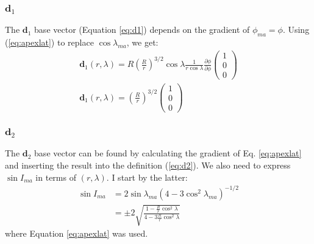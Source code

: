 \documentclass[11pt]{article}
\begin{document}
\subsubsection{$\mathbf{d}_1$}
The $\mathbf{d}_1$ base vector (Equation \ref{eq:d1}) depends on the gradient of $\phi_{ma} = \phi$. Using (\ref{eq:apexlat}) to replace $\cos\lambda_{ma}$, we get:
\begin{eqnarray}
\mathbf{d}_1(r, \lambda) = R\left(\frac{R}{r}\right)^{3/2}\cos\lambda \frac{1}{r\cos\lambda}\frac{\partial \phi}{\partial \phi} \begin{pmatrix} 1\\ 0\\ 0 \end{pmatrix} \\
\boxed{\mathbf{d}_1(r, \lambda) = \left(\frac{R}{r}\right)^{3/2}\begin{pmatrix}1\\ 0\\ 0\end{pmatrix} }
\end{eqnarray}

\subsubsection{$\mathbf{d}_2$}
The $\mathbf{d}_2$ base vector can be found by calculating the gradient of Eq. \ref{eq:apexlat} and inserting the result into the definition (\ref{eq:d2}). We also need to express $\sin I_{ma}$ in terms of $(r, \lambda)$. I start by the latter:
\begin{align}
\sin I_{ma} &= 2\sin \lambda_{ma} (4 - 3\cos^2\lambda_{ma})^{-1/2} \nonumber\\
&= \pm2\sqrt{\frac{1 - \frac{R}{r}\cos^2 \lambda}{4 - 3\frac{R}{r}\cos^2\lambda}}
\end{align}
where Equation \ref{eq:apexlat} was used.
\end{document}
